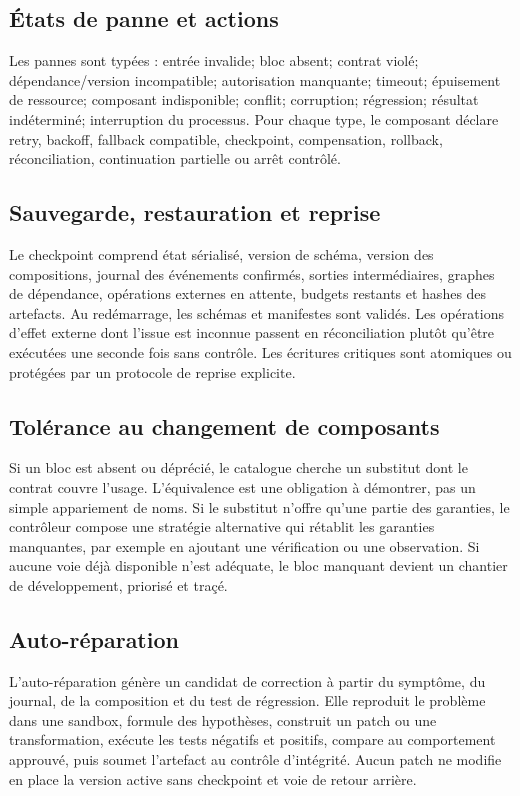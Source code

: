 \documentclass[11pt,a4paper]{article}
\begin{document}
\subsection{États de panne et actions}
Les pannes sont typées : entrée invalide; bloc absent; contrat violé; dépendance/version incompatible; autorisation manquante; timeout; épuisement de ressource; composant indisponible; conflit; corruption; régression; résultat indéterminé; interruption du processus. Pour chaque type, le composant déclare retry, backoff, fallback compatible, checkpoint, compensation, rollback, réconciliation, continuation partielle ou arrêt contrôlé.

\subsection{Sauvegarde, restauration et reprise}
Le checkpoint comprend état sérialisé, version de schéma, version des compositions, journal des événements confirmés, sorties intermédiaires, graphes de dépendance, opérations externes en attente, budgets restants et hashes des artefacts. Au redémarrage, les schémas et manifestes sont validés. Les opérations d'effet externe dont l'issue est inconnue passent en réconciliation plutôt qu'être exécutées une seconde fois sans contrôle. Les écritures critiques sont atomiques ou protégées par un protocole de reprise explicite.

\subsection{Tolérance au changement de composants}
Si un bloc est absent ou déprécié, le catalogue cherche un substitut dont le contrat couvre l'usage. L'équivalence est une obligation à démontrer, pas un simple appariement de noms. Si le substitut n'offre qu'une partie des garanties, le contrôleur compose une stratégie alternative qui rétablit les garanties manquantes, par exemple en ajoutant une vérification ou une observation. Si aucune voie déjà disponible n'est adéquate, le bloc manquant devient un chantier de développement, priorisé et traçé.

\subsection{Auto-réparation}
L'auto-réparation génère un candidat de correction à partir du symptôme, du journal, de la composition et du test de régression. Elle reproduit le problème dans une sandbox, formule des hypothèses, construit un patch ou une transformation, exécute les tests négatifs et positifs, compare au comportement approuvé, puis soumet l'artefact au contrôle d'intégrité. Aucun patch ne modifie en place la version active sans checkpoint et voie de retour arrière.
\end{document}
